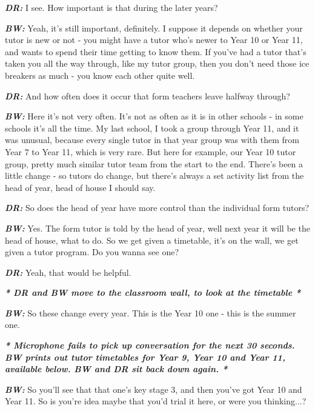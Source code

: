 \textit{\textbf{DR:}} I see. How important is that during the later years?

\textit{\textbf{BW:}} Yeah, it's still important, definitely. I suppose it depends on whether your tutor is new or not - you might have a tutor who's newer to Year 10 or Year 11, and wants to spend their time getting to know them. If you've had a tutor that's taken you all the way through, like my tutor group, then you don't need those ice breakers as much - you know each other quite well.

\textit{\textbf{DR:}} And how often does it occur that form teachers leave halfway through?

\textit{\textbf{BW:}} Here it's not very often. It's not as often as it is in other schools - in some schools it's all the time. My last school, I took a group through Year 11, and it was unusual, because every single tutor in that year group was with them from Year 7 to Year 11, which is very rare. But here for example, our Year 10 tutor group, pretty much similar tutor team from the start to the end. There's been a little change - so tutors do change, but there's always a set activity list from the head of year, head of house I should say.

\textit{\textbf{DR:}} So does the head of year have more control than the individual form tutors?

\textit{\textbf{BW:}} Yes. The form tutor is told by the head of year, well next year it will be the head of house, what to do. So we get given a timetable, it's on the wall, we get given a tutor program. Do you wanna see one?

\textit{\textbf{DR:}} Yeah, that would be helpful.

\begin{center}
\textit{\textbf{* DR and BW move to the classroom wall, to look at the timetable *}}
\end{center}

\textit{\textbf{BW:}} So these change every year. This is the Year 10 one - this is the summer one.

\begin{center}
\textit{\textbf{* Microphone fails to pick up conversation for the next 30 seconds. BW prints out tutor timetables for Year 9, Year 10 and Year 11, available below. BW and DR sit back down again. *}}\\
\end{center}

\textit{\textbf{BW:}} So you'll see that that one's key stage 3, and then you've got Year 10 and Year 11. So is you're idea maybe that you'd trial it here, or were you thinking...?

